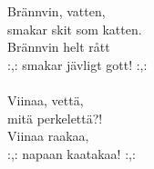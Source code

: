 
Brännvin, vatten, \\ smakar skit som katten. \\ Brännvin helt rått \\ :,: smakar jävligt gott! :,: \\ \hspace{10mm} \\ Viinaa, vettä, \\ mitä perkelettä?! \\ Viinaa raakaa, \\ :,: napaan kaatakaa! :,: